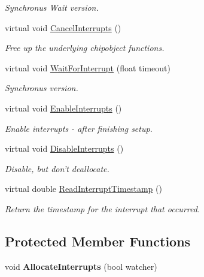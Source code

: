 \begin{DoxyCompactItemize}
\begin{DoxyCompactList}\small\item\em \-Synchronus \-Wait version. \end{DoxyCompactList}\item 
virtual void \hyperlink{classInterruptableSensorBase_a3a520da3879ef6fa5e383783ba10c361}{\-Cancel\-Interrupts} ()
\begin{DoxyCompactList}\small\item\em \-Free up the underlying chipobject functions. \end{DoxyCompactList}\item 
virtual void \hyperlink{classInterruptableSensorBase_a22a2c4f1fa4e2b4a8dfed2151c4de160}{\-Wait\-For\-Interrupt} (float timeout)
\begin{DoxyCompactList}\small\item\em \-Synchronus version. \end{DoxyCompactList}\item 
virtual void \hyperlink{classInterruptableSensorBase_a2c340ba527bd05f588d356ed16ac48f3}{\-Enable\-Interrupts} ()
\begin{DoxyCompactList}\small\item\em \-Enable interrupts -\/ after finishing setup. \end{DoxyCompactList}\item 
virtual void \hyperlink{classInterruptableSensorBase_ad619428f0a23dbf9ccc87ab4c187702b}{\-Disable\-Interrupts} ()
\begin{DoxyCompactList}\small\item\em \-Disable, but don't deallocate. \end{DoxyCompactList}\item 
virtual double \hyperlink{classInterruptableSensorBase_ae3bd40c1b8329f35789b02881d9bc78d}{\-Read\-Interrupt\-Timestamp} ()
\begin{DoxyCompactList}\small\item\em \-Return the timestamp for the interrupt that occurred. \end{DoxyCompactList}\end{DoxyCompactItemize}
\subsection*{\-Protected \-Member \-Functions}
\begin{DoxyCompactItemize}
\item 
\hypertarget{classInterruptableSensorBase_adff75b700f436833a3c06992d61ec6d0}{void {\bfseries \-Allocate\-Interrupts} (bool watcher)}\label{classInterruptableSensorBase_adff75b700f436833a3c06992d61ec6d0}

\end{DoxyCompactItemize}
